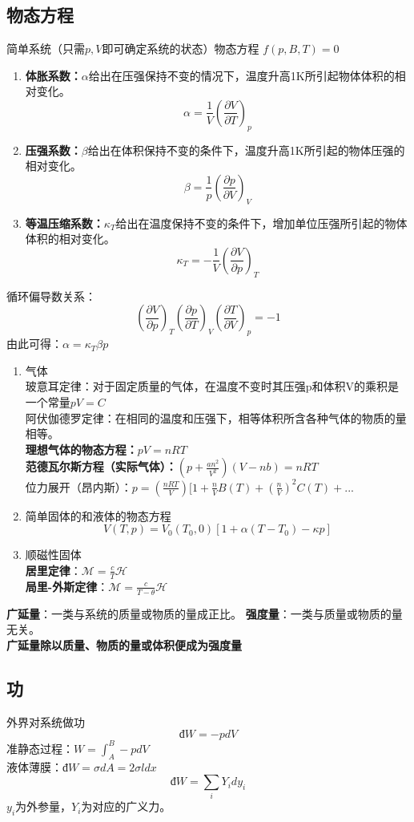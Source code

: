 \documentclass[12pt,a4paper]{article}
\begin{document}
\subsection{物态方程}
简单系统（只需\(p,V\)即可确定系统的状态）物态方程 \(f(p,B,T)=0\)
\begin{enumerate}
    \item \textbf{体胀系数：}\(\alpha\)给出在压强保持不变的情况下，温度升高1K所引起物体体积的相对变化。
    \[
    \alpha=\frac{1}{V}(\frac{\partial V}{\partial T})_p
    \] 
    \item \textbf{压强系数：}\(\beta\)给出在体积保持不变的条件下，温度升高1K所引起的物体压强的相对变化。
    \[
    \beta=\frac{1}{p}(\frac{\partial p}{\partial V})_V
    \]
    \item \textbf{等温压缩系数：}\(\kappa_T\)给出在温度保持不变的条件下，增加单位压强所引起的物体体积的相对变化。
    \[
    \kappa_T=-\frac{1}{V}(\frac{\partial V}{\partial p})_T
    \]
\end{enumerate}
循环偏导数关系：
\[
(\frac{\partial V}{\partial p})_T(\frac{\partial p}{\partial T})_V(\frac{\partial T}{\partial V})_p=-1
\]
由此可得：\(\alpha=\kappa_T\beta p\)
\begin{enumerate}
    \item 气体\\
    玻意耳定律：对于固定质量的气体，在温度不变时其压强p和体积V的乘积是一个常量\(pV=C\)\\
    阿伏伽德罗定律：在相同的温度和压强下，相等体积所含各种气体的物质的量相等。\\
    \textbf{理想气体的物态方程：}\(pV=nRT\)\\
    \textbf{范德瓦尔斯方程（实际气体）：}\((p+\frac{an^2}{V^2})(V-nb)=nRT\)\\
    位力展开（昂内斯）：\(p=(\frac{nRT}{V})[1+\frac{n}{V}B(T)+(\frac{n}{V})^2C(T)+...\)
    \item 简单固体的和液体的物态方程
    \[
    V(T,p)=V_0(T_0,0)[1+\alpha(T-T_0)-\kappa p]
    \]
    \item 顺磁性固体\\
    \textbf{居里定律}：\(\mathcal{M}=\frac{c}{T}\mathcal{H}\)\\
    \textbf{局里-外斯定律}：\(\mathcal{M}=\frac{c}{T-\theta}\mathcal{H}\)
\end{enumerate}
\textbf{广延量}：一类与系统的质量或物质的量成正比。
\textbf{强度量}：一类与质量或物质的量无关。\\
\textbf{广延量除以质量、物质的量或体积便成为强度量}

\subsection{功}
外界对系统做功
\[
\mathrm{đ}W=-pdV
\]
准静态过程：\(W=\int_A^B-pdV\)\\
液体薄膜：\(\mathrm{đ}W=\sigma dA=2\sigma ldx\)
\[
\mathrm{đ}W=\sum_iY_idy_i
\]
\(y_i\)为外参量，\(Y_i\)为对应的广义力。
\end{document}
